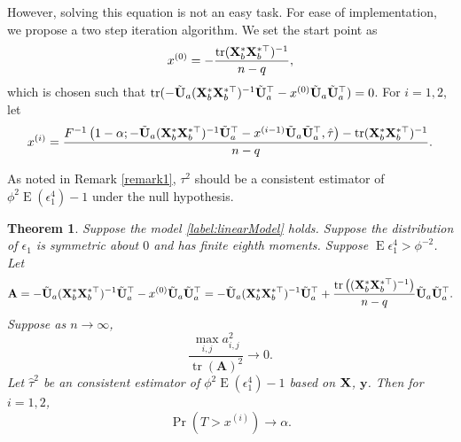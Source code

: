 \documentclass[11pt]{article}
\DeclareMathOperator{\mytr}{tr}
\DeclareMathOperator{\myE}{E}
\newcommand{\By}{\mathbf{y}}    \newcommand{\Bz}{\mathbf{z}}
\newcommand{\BA}{\mathbf{A}}    \newcommand{\BB}{\mathbf{B}}    \newcommand{\BC}{\mathbf{C}}    \newcommand{\BD}{\mathbf{D}}    \newcommand{\BE}{\mathbf{E}}    \newcommand{\BF}{\mathbf{F}}    \newcommand{\BG}{\mathbf{G}}    \newcommand{\BH}{\mathbf{H}}    \newcommand{\BI}{\mathbf{I}}    \newcommand{\BJ}{\mathbf{J}}    \newcommand{\BK}{\mathbf{K}}    \newcommand{\BL}{\mathbf{L}}
\theoremstyle{plain}
\newtheorem{theorem}{\quad\quad Theorem}
\theoremstyle{definition}
\theoremstyle{remark}
\begin{document}
However, solving this equation is not an easy task.
For ease of implementation, we propose a two step iteration algorithm.
We set the start point as
\begin{equation*}
    x^{(0)} =  -\frac{\mytr ( \BX_b^* \BX_b^{*\top} )^{-1}}{n-q},
\end{equation*}
which is chosen such that $\mytr( -\tilde{\BU}_a ( \BX_b^* \BX_b^{*\top} )^{-1} \tilde{\BU}_a^\top 
-x^{(0)}\tilde{\BU}_a \tilde{\BU}_a^\top )=0$.
For $i=1,2$, let
\begin{equation*}
    x^{(i)}= 
        \frac{
            F^{-1}\left(1-\alpha;-\tilde{\BU}_a ( \BX_b^* \BX_b^{*\top} )^{-1} \tilde{\BU}_a^\top 
                -x^{(i-1)}\tilde{\BU}_a \tilde{\BU}_a^\top
,\hat \tau\right)
-
   \mytr (\BX_b^* \BX_b^{*\top})^{-1} 
   }{n-q}
.
\end{equation*}

        As noted in Remark \ref{remark1}, $\tau^2$ should be a consistent estimator of $\phi^2 \myE (\epsilon_1^4)-1$ under the null hypothesis.

\begin{theorem}
    Suppose the model \eqref{label:linearModel} holds.
    Suppose the distribution of $\epsilon_1$ is symmetric about $0$ and has finite eighth moments.
    Suppose $\myE \epsilon_1^4> \phi^{-2}$.
Let
    \begin{equation*}
        \BA=
 -\tilde{\BU}_a ( \BX_b^* \BX_b^{*\top} )^{-1} \tilde{\BU}_a^\top 
-x^{(0)}\tilde{\BU}_a \tilde{\BU}_a^\top
        =
        -\tilde{\BU}_a (\BX_{b}^* \BX_b^{*\top})^{-1} \tilde{\BU}_a^\top 
        + \frac{\mytr\left( (\BX_b^* \BX_b^{*\top})^{-1} \right)}{n-q}\tilde{\BU}_a \tilde{\BU}_a^\top
        .
    \end{equation*}
    Suppose as $n\to \infty$,
    \begin{equation}\label{eq:jianchiCondition}
        \frac{ 
            \max_{i,j}a_{i,j}^2
    }{\mytr \left(
                \BA \right)^2}  \to 0.
    \end{equation}
        Let $\hat \tau^2$ be an consistent estimator of $\phi^2 \myE (\epsilon_1^4)-1$ based on $\mathbf{X}$, $\By$.
        Then for $i=1,2$,
    \begin{equation*}
        \Pr\left( T >
            x^{(i)}
    \right)
            \to \alpha.
    \end{equation*}
    \label{thm:criticalValue}
\end{theorem}
\end{document}
